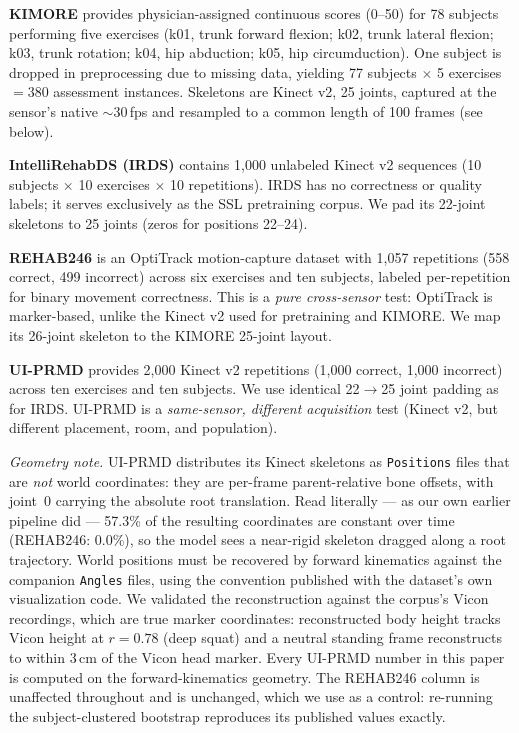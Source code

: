 \documentclass[10pt,journal]{IEEEtran}
\begin{document}
\textbf{KIMORE} \cite{capecci2019kimore} provides physician-assigned continuous scores (0--50) for 78 subjects performing five exercises (k01, trunk forward flexion; k02, trunk lateral flexion; k03, trunk rotation; k04, hip abduction; k05, hip circumduction). One subject is dropped in preprocessing due to missing data, yielding 77 subjects $\times$ 5 exercises $= 380$ assessment instances. Skeletons are Kinect v2, 25 joints, captured at the sensor's native $\sim$30\,fps and resampled to a common length of 100 frames (see below).

\textbf{IntelliRehabDS (IRDS)} \cite{capecci2019kimore} contains 1,000 unlabeled Kinect v2 sequences (10 subjects $\times$ 10 exercises $\times$ 10 repetitions). IRDS has no correctness or quality labels; it serves exclusively as the SSL pretraining corpus. We pad its 22-joint skeletons to 25 joints (zeros for positions 22--24).

\textbf{REHAB246} \cite{rehab246} is an OptiTrack motion-capture dataset with 1,057 repetitions (558 correct, 499 incorrect) across six exercises and ten subjects, labeled per-repetition for binary movement correctness. This is a \emph{pure cross-sensor} test: OptiTrack is marker-based, unlike the Kinect v2 used for pretraining and KIMORE. We map its 26-joint skeleton to the KIMORE 25-joint layout.

\textbf{UI-PRMD} \cite{vakanski2018uiprmd} provides 2,000 Kinect v2 repetitions (1,000 correct, 1,000 incorrect) across ten exercises and ten subjects. We use identical 22$\to$25 joint padding as for IRDS. UI-PRMD is a \emph{same-sensor, different acquisition} test (Kinect v2, but different placement, room, and population).

\emph{Geometry note.} UI-PRMD distributes its Kinect skeletons as \texttt{Positions} files that are \emph{not} world coordinates: they are per-frame parent-relative bone offsets, with joint~0 carrying the absolute root translation. Read literally --- as our own earlier pipeline did --- 57.3\% of the resulting coordinates are constant over time (REHAB246: 0.0\%), so the model sees a near-rigid skeleton dragged along a root trajectory. World positions must be recovered by forward kinematics against the companion \texttt{Angles} files, using the convention published with the dataset's own visualization code. We validated the reconstruction against the corpus's Vicon recordings, which are true marker coordinates: reconstructed body height tracks Vicon height at $r = 0.78$ (deep squat) and a neutral standing frame reconstructs to within 3\,cm of the Vicon head marker. Every UI-PRMD number in this paper is computed on the forward-kinematics geometry. The REHAB246 column is unaffected throughout and is unchanged, which we use as a control: re-running the subject-clustered bootstrap reproduces its published values exactly.
\end{document}
